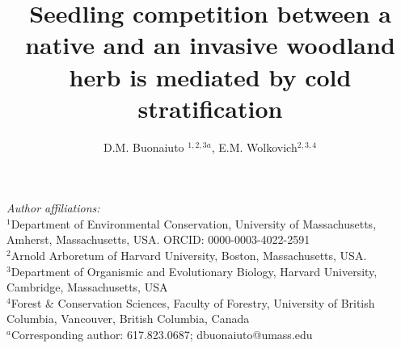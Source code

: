 \documentclass{article}[11pt]
\title{Seedling competition between a native %
and an invasive %
woodland herb is mediated by cold stratification}
\author{D.M. Buonaiuto $^{1,2,3a}$, E.M. Wolkovich$^{2,3,4}$}
\date{}
\begin{document}

\maketitle
\noindent \emph{Author affiliations:}\\
\noindent $^1$Department of Environmental Conservation, University of Massachusetts, Amherst, Massachusetts, USA. ORCID: 0000-0003-4022-2591\\
\noindent $^2$Arnold Arboretum of Harvard University, Boston, Massachusetts, USA.\\
$^3$Department of Organismic and Evolutionary Biology, Harvard University, Cambridge, Massachusetts, USA \\
$^4$Forest \& Conservation Sciences, Faculty of Forestry, University of British Columbia, Vancouver, British Columbia, Canada\\
$^a$Corresponding author: 617.823.0687; dbuonaiuto@umass.edu\\

\pagebreak
\end{document}
